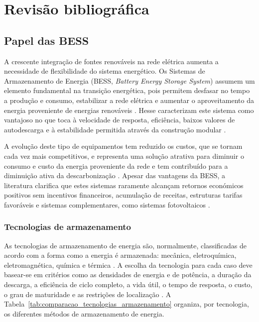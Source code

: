 
\chapter{Revisão bibliográfica}	%
\label{Chapter2}	%



\section{Papel das BESS}
\label{sec:Ch2.1}

A crescente integração de fontes renováveis na rede elétrica aumenta a necessidade de flexibilidade do sistema energético. Os Sistemas de Armazenamento de Energia (BESS, \textit{Battery Energy Storage System}) assumem um elemento fundamental na transição energética, pois permitem desfasar no tempo a produção e consumo, estabilizar a rede elétrica e aumentar o aproveitamento da energia proveniente de energias renováveis \cite{enel_bess} \cite{ Shamarova2022}. Hesse \cite{ Hesse2017} caracterizam este sistema como vantajoso no que toca à velocidade de resposta, eficiência, baixos valores de autodescarga e à estabilidade permitida através da construção modular \cite{ Hesse2017}.

A evolução deste tipo de equipamentos tem reduzido os custos, que se tornam cada vez mais competitivos, e representa uma solução atrativa para diminuir o consumo e custo da energia proveniente da rede e tem contribuído para a diminuição ativa da descarbonização \cite{enel_bess} \cite{ Shamarova2022}. Apesar das vantagens da BESS, a literatura clarifica que estes sistemas raramente alcançam retornos económicos positivos sem incentivos financeiros, acumulação de receitas, estruturas tarifas favoráveis e sistemas complementares, como sistemas fotovoltaicos \cite{ Dratsas2022}.


\subsection{Tecnologias de armazenamento }
\label{sec:Ch2.1.1}

As tecnologias de armazenamento de energia são, normalmente, classificadas de acordo com a forma como a energia é armazenada: mecânica, eletroquímica, eletromagnética, química e térmica \cite{ Balwani2021} \cite{Mahlia2014}.  A escolha da tecnologia para cada caso deve basear-se em critérios como as densidades de energia e de potência, a duração da descarga, a eficiência de ciclo completo, a vida útil, o tempo de resposta, o custo, o grau de maturidade e as restrições de localização \cite{Mahlia2014} \cite{Luo2015}. A Tabela~\ref{tab:comparacao_tecnologias_armazenamento} organiza, por tecnologia, os diferentes métodos de armazenamento de energia.



